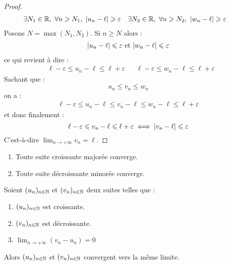 \begin{proof}
    \begin{align*}
        &\exists N_1 \in \mathbb{R},\ \forall n \geqslant N_1,\ \abs{u_n - \ell} \geqslant \varepsilon &
        &\exists N_2 \in \mathbb{R},\ \forall n \geqslant N_2,\ \abs{w_n - \ell} \geqslant \varepsilon
    \end{align*}
    Posons $N = \max(N_1, N_2)$. Si $n \geq N$ alors :
    \begin{align*}
        \abs{u_n - \ell} \leqslant \varepsilon \text{ et } \abs{w_n - \ell} \leqslant \varepsilon
    \end{align*}
    ce qui revient à dire : 
    \begin{align*}
        &\ell - \varepsilon \leq u_n - \ell \leq \ell + \varepsilon & &\ell - \varepsilon \leq w_n - \ell \leq \ell + \varepsilon
    \end{align*}
    Sachant que :
    \[ u_n \leq v_n \leq w_n \]
    on a :
    \begin{align*}
        \ell - \varepsilon \leq u_n - \ell \leq v_n - \ell \leq w_n - \ell \leq \ell + \varepsilon
    \end{align*}
    et donc finalement :
    \[ \ell - \varepsilon \leqslant v_n - \ell \leqslant \ell + \varepsilon \iff \abs{v_n - \ell} \leqslant \varepsilon \]
    C'est-à-dire $\lim_{n \to +\infty} v_n = \ell$.
\end{proof}

\begin{theorem}
    \begin{enumerate}
        \item Toute suite croissante majorée converge.
        \item Toute suite décroissante minorée converge.
    \end{enumerate}
\end{theorem}

\begin{theorem}
    Soient $(u_n)_{n \in \mathbb{N}}$ et $(v_n)_{n \in \mathbb{N}}$ deux suites telles que :
    \begin{enumerate}
            \item $(u_n)_{n \in \mathbb{N}}$ est croissante.
            \item $(v_n)_{n \in \mathbb{N}}$ est décroissante.
            \item $\lim_{n \to +\infty} (v_n - u_n) = 0$
        \end{enumerate}
    \noindent Alors $(u_n)_{n \in \mathbb{N}}$ et $(v_n)_{n \in \mathbb{N}}$ convergent vers la même limite.
\end{theorem}

